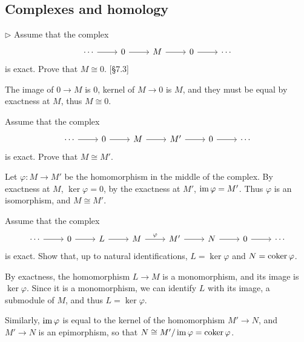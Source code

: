 \subsection{Complexes and homology}

\begin{problem}
	$\triangleright$ Assume that the complex
	\[
		\begin{tikzcd}
			\cdots
			\arrow[r]
			& 0
			\arrow[r]
			& M
			\arrow[r]
			& 0
			\arrow[r]
			& \cdots
		\end{tikzcd}
	\]
	is exact. Prove that $M \cong 0$. [\S 7.3]
\end{problem}

\begin{solution}
	The image of $0 \to M$ is $0$, kernel of $M \to 0$ is $M$, and they must be equal by exactness at $M$, thus $M \cong 0$.
\end{solution}

\begin{problem}
	Assume that the complex
	\[
		\begin{tikzcd}
			\cdots
			\arrow[r]
			& 0
			\arrow[r]
			& M
			\arrow[r]
			& M'
			\arrow[r]
			& 0
			\arrow[r]
			& \cdots
		\end{tikzcd}
	\]
	is exact. Prove that $M \cong M'$.
\end{problem}

\begin{solution}
	Let $\varphi: M \to M'$ be the homomorphism in the middle of the complex. By exactness at $M$, $\ker \varphi = 0$, by the exactness at $M'$, $\operatorname{im} \varphi = M'$. Thus $\varphi$ is an isomorphism, and $M \cong M'$.
\end{solution}

\begin{problem}
	Assume that the complex
	\[
		\begin{tikzcd}
			\cdots
			\arrow[r]
			& 0
			\arrow[r]
			& L
			\arrow[r]
			& M
			\arrow[r, "\varphi"]
			& M'
			\arrow[r]
			& N
			\arrow[r]
			& 0
			\arrow[r]
			& \cdots
		\end{tikzcd}
	\]
	is exact. Show that, up to natural identifications, $L = \ker \varphi$ and $N = \operatorname{coker} \varphi$.
\end{problem}

\begin{solution}
	By exactness, the homomorphism $L \to M$ is a monomorphism, and its image is $\ker \varphi$. Since it is a monomorphism, we can identify $L$ with its image, a submodule of $M$, and thus $L = \ker \varphi$.
	
	Similarly, $\operatorname{im} \varphi$ is equal to the kernel of the homomorphism $M' \to N$, and $M' \to N$ is an epimorphism, so that $N \cong M'/\operatorname{im} \varphi = \operatorname{coker} \varphi$.
\end{solution}

